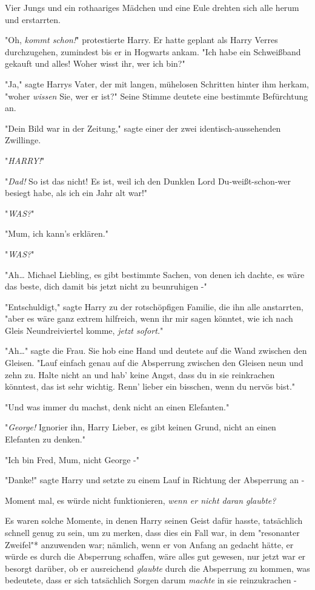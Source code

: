 {Vier Jungs und ein rothaariges Mädchen und eine Eule drehten sich alle herum und erstarrten.

"Oh, \emph{kommt schon!}" protestierte Harry. Er hatte geplant als Harry Verres durchzugehen, zumindest bis er in Hogwarts ankam. "Ich habe ein Schweißband gekauft und alles! Woher wisst ihr, wer ich bin?"

"Ja," sagte Harrys Vater, der mit langen, mühelosen Schritten hinter ihm herkam, "woher \emph{wissen} Sie, wer er ist?" Seine Stimme deutete eine bestimmte Befürchtung an.

"Dein Bild war in der Zeitung," sagte einer der zwei identisch-aussehenden Zwillinge.

"\emph{HARRY!}"

"\emph{Dad!} So ist das nicht! Es ist, weil ich den Dunklen Lord Du-weißt-schon-wer besiegt habe, als ich ein Jahr alt war!"

"\emph{WAS?}"

"Mum, ich kann's erklären."

"\emph{WAS?}"

"Ah… Michael Liebling, es gibt bestimmte Sachen, von denen ich dachte, es wäre das beste, dich damit bis jetzt nicht zu beunruhigen -"

"Entschuldigt," sagte Harry zu der rotschöpfigen Familie, die ihn alle anstarrten, "aber es wäre ganz extrem hilfreich, wenn ihr mir sagen könntet, wie ich nach Gleis Neundreiviertel komme, \emph{jetzt sofort.}"

"Ah…" sagte die Frau. Sie hob eine Hand und deutete auf die Wand zwischen den Gleisen. "Lauf einfach genau auf die Absperrung zwischen den Gleisen neun und zehn zu. Halte nicht an und hab' keine Angst, dass du in sie reinkrachen könntest, das ist sehr wichtig. Renn' lieber ein bisschen, wenn du nervös bist."

"Und was immer du machst, denk nicht an einen Elefanten."

"\emph{George!} Ignorier ihn, Harry Lieber, es gibt keinen Grund, nicht an einen Elefanten zu denken."

"Ich bin Fred, Mum, nicht George -"

"Danke!" sagte Harry und setzte zu einem Lauf in Richtung der Absperrung an -

Moment mal, es würde nicht funktionieren, \emph{wenn er nicht daran glaubte?}

Es waren solche Momente, in denen Harry seinen Geist dafür hasste, tatsächlich schnell genug zu sein, um zu merken, dass dies ein Fall war, in dem "resonanter Zweifel"* anzuwenden war; nämlich, wenn er von Anfang an gedacht hätte, er würde es durch die Absperrung schaffen, wäre alles gut gewesen, nur jetzt war er besorgt darüber, ob er ausreichend \emph{glaubte} durch die Absperrung zu kommen, was bedeutete, dass er sich tatsächlich Sorgen darum \emph{machte} in sie reinzukrachen -

}
